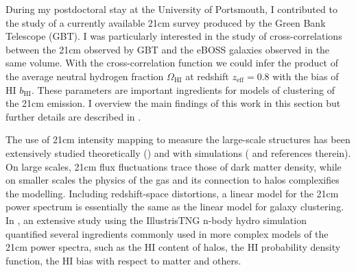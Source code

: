 During my postdoctoral stay at the University of Portsmouth, 
I contributed to the study of a currently available 21cm survey produced by the Green Bank Telescope (GBT).
I was particularly interested in the study of cross-correlations between the 21cm 
observed by GBT and the eBOSS galaxies observed in the same volume. 
With the cross-correlation function we could infer the product of the average neutral hydrogen fraction 
$\Omega_\text{HI}$ at redshift $z_\text{eff} = 0.8$ with the bias of HI $b_\text{HI}$.  
These parameters are important ingredients for models of clustering of the 21cm emission.
I overview the main findings of this work in this section but further details 
are described in \cite{wolzConstraintsCrosscorrelationEBOSS2022}. 

The use of 21cm intensity mapping to measure the large-scale structures has been 
extensively studied theoretically 
(\cite{bharadwajUsingHIProbe2001,
battyeNeutralHydrogenSurveys2004,
mcquinnCosmologicalParameterEstimation2006,
changBaryonAcousticOscillation2008a}) 
and with simulations 
(\cite{mesinger21CMFASTFastSeminumerical2011,
villaescusa-navarroIngredients21Cm2018} and references therein). 
On large scales, 21cm flux fluctuations trace those of dark matter density, while on smaller scales 
the physics of the gas and its connection to halos complexifies the modelling.  
Including redshift-space distortions, a linear model for the 21cm power spectrum is essentially the 
same as the linear model for galaxy clustering. 
In \cite{villaescusa-navarroIngredients21Cm2018}, an extensive study using the IllustrisTNG 
n-body hydro simulation quantified several ingredients commonly used in more complex models of 
the 21cm power spectra, such as the HI content of halos, the HI probability density function, 
the HI bias with respect to matter and others. 

